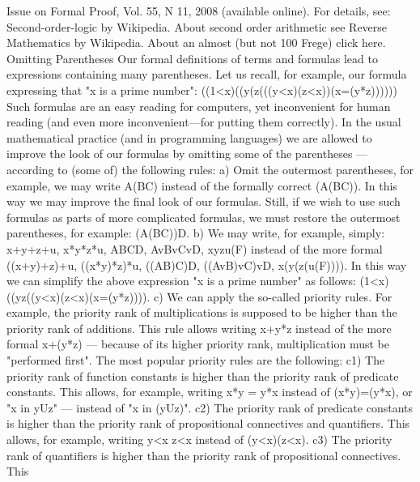 Issue on Formal Proof, Vol. 55, N 11, 2008 (available online).
For details, see: Second-order-logic by Wikipedia. About second order arithmetic see Reverse Mathematics by Wikipedia.
About an almost (but not 100%
Frege) click here.
Omitting Parentheses
Our formal definitions of terms and formulas lead to expressions containing many parentheses. Let us
recall, for example, our formula expressing that "x is a prime number":
((1<x)\AND (\neg (\exists y(\exists z(((y<x)\AND (z<x))\AND (x=(y*z))))))
Such formulas are an easy reading for computers, yet inconvenient for human reading (and even more
inconvenient---for putting them correctly). In the usual mathematical practice (and in programming
languages) we are allowed to improve the look of our formulas by omitting some of the parentheses ---
according to (some of) the following rules:
a) Omit the outermost parentheses, for example, we may write A\IMPLIES (B\IMPLIES C) instead of the formally correct
(A\IMPLIES (B\IMPLIES C)). In this way we may improve the final look of our formulas. Still, if we wish to use such
formulas as parts of more complicated formulas, we must restore the outermost parentheses, for example:
(A\IMPLIES (B\IMPLIES C))\IMPLIES D.
b) We may write, for example, simply:
x+y+z+u, x*y*z*u, A\AND B\AND C\AND D, AvBvCvD, \exists x\forall y\exists z\forall u(F)
instead of the more formal
((x+y)+z)+u, ((x*y)*z)*u, ((A\AND B)\AND C)\AND D, ((AvB)vC)vD, \exists x(\forall y(\exists z(\forall u(F)))).
In this way we can simplify the above expression "x is a prime number" as follows:
(1<x)\AND (\neg (\exists y\exists z((y<x)\AND (z<x)\AND (x=(y*z)))).
c) We can apply the so-called priority rules. For example, the priority rank of multiplications is supposed
to be higher than the priority rank of additions. This rule allows writing x+y*z instead of the more formal
x+(y*z) --- because of its higher priority rank, multiplication must be "performed first". The most popular
priority rules are the following:
c1) The priority rank of function constants is higher than the priority rank of predicate constants. This
allows, for example, writing x*y = y*x instead of (x*y)=(y*x), or "x in yUz" --- instead of "x in (yUz)".
c2) The priority rank of predicate constants is higher than the priority rank of propositional connectives
and quantifiers. This allows, for example, writing y<x \AND  z<x instead of (y<x)\AND (z<x).
c3) The priority rank of quantifiers is higher than the priority rank of propositional connectives. This
